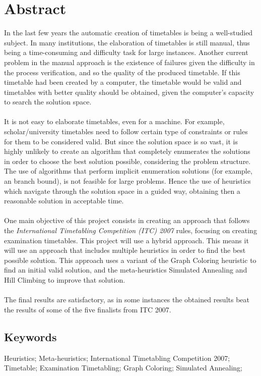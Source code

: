 \chapter*{Abstract}

In the last few years the automatic creation of timetables is being a well-studied subject. In many institutions, the elaboration of timetables is still manual, thus being a time-consuming and difficulty task for large instances. Another current problem in the manual approach is the existence of failures given the difficulty in the process verification, and so the quality of the produced timetable. If this timetable had been created by a computer, the timetable would be valid and timetables with better quality should be obtained, given the computer's capacity to search the solution space.\\
\\
It is not easy to elaborate timetables, even for a machine. For example, scholar/university timetables need to follow certain type of constraints or rules for them to be considered valid. But since the solution space is so vast, it is highly unlikely to create an algorithm that completely enumerates the solutions in order to choose the best solution possible, considering the problem structure. The use of algorithms that perform implicit enumeration solutions (for example, an branch bound), is not feasible for large problems. Hence the use of heuristics which navigate through the solution space in a guided way, obtaining then a reasonable solution in acceptable time.\\
\\
One main objective of this project consists in creating an approach that follows the \textit{International Timetabling Competition (ITC) 2007} rules, focusing on creating examination timetables. This project will use a hybrid approach. This means it will use an approach that includes multiple heuristics in order to find the best possible solution. This approach uses a variant of the Graph Coloring heuristic to find an initial valid solution, and the meta-heuristics Simulated Annealing and Hill Climbing to improve that solution.\\
\\
The final results are satisfactory, as in some instances the obtained results beat the results of some of the five finalists from ITC 2007.


\section*{Keywords}

Heuristics; Meta-heuristics; International Timetabling Competition 2007; Timetable; Examination Timetabling; Graph Coloring; Simulated Annealing;

